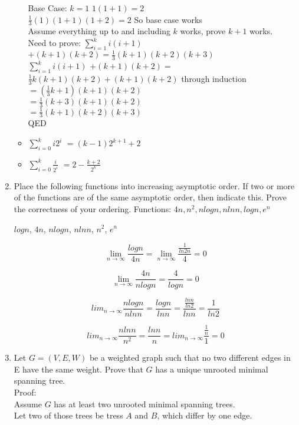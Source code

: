 \documentclass[12pt]{article}
\begin{document}
\begin{enumerate}
\begin{itemize}
Base Case: $k=1$
$1(1+1) = 2$\\
$\frac{1}{3}(1)(1+1)(1+2) = 2$ So base case works\\

Assume everything up to and including $k$ works, prove $k+1$ works.\\
Need to prove: $\displaystyle\sum\limits_{i=1}^k i(i+1)$ $+(k+1)(k+2) =
\frac{1}{3}(k+1)(k+2)(k+3)$\\
$\displaystyle\sum\limits_{i=1}^k i(i+1)$ $+(k+1)(k+2) =$\\
$\frac{1}{3}k(k+1)(k+2)+(k+1)(k+2)$ through induction\\
$= (\frac{1}{3}k+1)(k+1)(k+2)$\\
$= \frac{1}{3}(k+3)(k+1)(k+2)$\\
$= \frac{1}{3}(k+1)(k+2)(k+3)$\\
QED
\item $\displaystyle\sum\limits_{i=0}^k i2^i $ $= (k-1)2^{k+1}+2$
\item $\displaystyle\sum\limits_{i=0}^k \frac{i}{2^i} $ $= 2-\frac{k+2}{2^k}$
\end{itemize}


\item Place the following functions into increasing asymptotic order. If two
or more of the functions are of the same asymptotic order, then indicate this.
Prove the correctness of your ordering.
Functions: $4n, n^2, nlogn, nlnn, logn, e^n$

$logn$, $4n$, $nlogn$, $nlnn$, $n^2$, $e^n$


$$\lim_{n\to\infty} \frac{logn}{4n} = \lim_{n\to\infty} \frac{\frac{1}{ln2n}}{4} = 0$$

$$\lim_{n\to\infty} \frac{4n}{nlogn} = \frac{4}{logn} = 0$$

$$lim_{n\to\infty} \frac{nlogn}{nlnn} = \frac{logn}{lnn} =
\frac{\frac{lnn}{ln2}}{lnn} = \frac{1}{ln2}$$

$$lim_{n\to\infty} \frac{nlnn}{n^2} = \frac{lnn}{n} = lim_{n\to\infty}
\frac{\frac{1}{n}}{1} = 0$$


\item Let $G = (V,E,W)$ be a weighted graph such that no two different edges
in E have the same weight. Prove that $G$ has a unique unrooted minimal spanning
tree.\\
Proof:\\
Assume $G$ has at least two unrooted minimal spanning trees.\\
Let two of those trees be tress $A$ and $B$, which differ by one
edge.


\end{enumerate}
\end{document}
